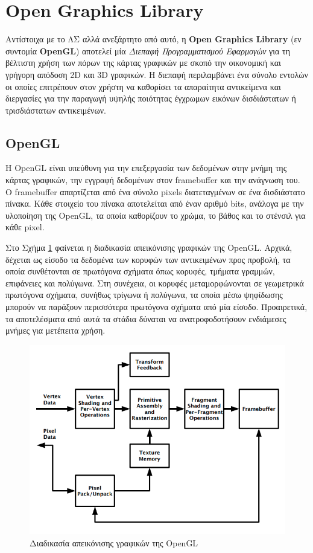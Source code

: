 \section{Open Graphics Library}
\label{sec:ogl}

Αντίστοιχα με το ΛΣ αλλά ανεξάρτητο από αυτό, η \textbf{Open Graphics Library}\cite{opengl_specification} (εν συντομία \textbf{OpenGL}) αποτελεί μία \textsl{Διεπαφή Προγραμματισμού Εφαρμογών} για τη βέλτιστη χρήση των πόρων της κάρτας γραφικών με σκοπό την οικονομική και γρήγορη απόδοση 2D και 3D γραφικών. Η διεπαφή περιλαμβάνει ένα σύνολο εντολών οι οποίες επιτρέπουν στον χρήστη να καθορίσει τα απαραίτητα αντικείμενα και διεργασίες για την παραγωγή υψηλής ποιότητας έγχρωμων εικόνων δισδιάστατων ή τρισδιάστατων αντικειμένων.

\subsection{OpenGL}
Η OpenGL είναι υπεύθυνη για την επεξεργασία των δεδομένων στην μνήμη της κάρτας γραφικών, την εγγραφή δεδομένων στον framebuffer και την ανάγνωση του. Ο framebuffer απαρτίζεται από ένα σύνολο pixels διατεταγμένων σε ένα δισδιάστατο πίνακα. Κάθε στοιχείο του πίνακα αποτελείται από έναν αριθμό bits, ανάλογα με την υλοποίηση της OpenGL, τα οποία καθορίζουν το χρώμα, το βάθος και το στένσιλ για κάθε pixel.

Στο Σχήμα \ref{fig:opengl_pipeline} φαίνεται η διαδικασία απεικόνισης γραφικών της OpenGL. Αρχικά, δέχεται ως είσοδο τα δεδομένα των κορυφών των αντικειμένων προς προβολή, τα οποία συνθέτονται σε πρωτόγονα σχήματα όπως κορυφές, τμήματα γραμμών, επιφάνειες και πολύγωνα. Στη συνέχεια, οι κορυφές μεταμορφώνονται σε γεωμετρικά πρωτόγονα σχήματα, συνήθως τρίγωνα ή πολύγωνα, τα οποία μέσω ψηφίδωσης μπορούν να παράξουν περισσότερα πρωτόγονα σχήματα από μία είσοδο. Προαιρετικά, τα αποτελέσματα από αυτά τα στάδια δύναται να ανατροφοδοτήσουν ενδιάμεσες μνήμες για μετέπειτα χρήση.

\begin{figure}[t]
	\centering
	\includegraphics[scale=2.2]{images/chapter2/opengl_pipeline.jpg}
	\caption{Διαδικασία απεικόνισης γραφικών της OpenGL}
	\label{fig:opengl_pipeline}
\end{figure}


